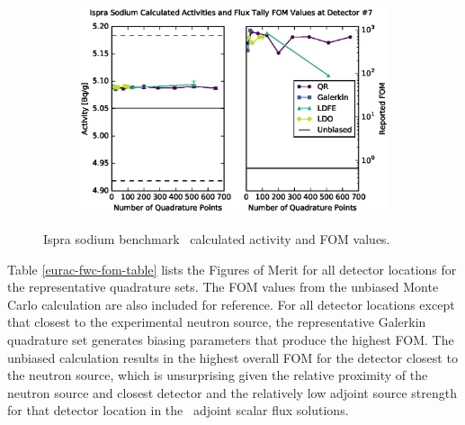 \begin{figure}[!htb]
\ContinuedFloat
\begin{subfigure}{\linewidth}
\centering
\includegraphics[max height=0.445\textheight]
{img/eurac-plots/mcnp/fwc-74.eps}
\label{eurac-74}
\end{subfigure}
\caption{Ispra sodium benchmark \fwc\ calculated activity and FOM values.}
\label{eurac-fwc-tally}
\end{figure}

Table \ref{eurac-fwc-fom-table} lists the Figures of Merit for all detector locations for the
representative quadrature sets. The FOM values from the unbiased Monte Carlo calculation are
also included for reference. For all detector locations except that closest to the experimental
neutron source, the representative Galerkin quadrature set generates biasing parameters that
produce the highest FOM. The unbiased calculation results in the highest overall FOM for the
detector closest to the neutron source, which is unsurprising given the relative proximity of
the neutron source and closest detector and the relatively low adjoint source strength for that
detector location in the \fwc\ adjoint scalar flux solutions.

